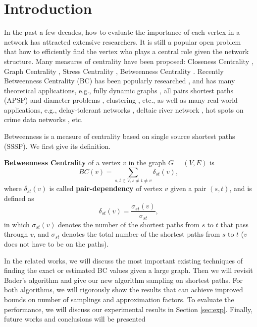 \documentclass[10pt]{article}
\begin{document}
\section{Introduction}
In the past a few decades, how to evaluate the importance of each vertex in a network has attracted extensive researchers. It is still a popular open problem that how to efficiently find the vertex who plays a central role given the network structure. Many measures of centrality have been proposed: Closeness Centrality \cite{sabidussi1966centrality}, Graph Centrality \cite{hage1995eccentricity}, Stress Centrality \cite{shimbel1953structural}, Betweenness Centrality \cite{freeman1977set}. Recently Betweenness Centrality (BC) has been popularly researched \cite{bader2007approximating, brandes2008variants, abboud2015subcubic}, and has many theoretical applications, e.g., fully dynamic graphs \cite{lee2016efficient}, all pairs shortest paths (APSP) and diameter problems \cite{abboud2015subcubic}, clustering \cite{fairbanks2015behavioral}, etc., as well as many real-world applications, e.g., delay-tolerant networks \cite{magaia2015betweenness}, deltaic river network \cite{cui2015assessment}, hot spots on crime data networks \cite{sivaranjani2015mitigating}, etc.

Betweenness is a measure of centrality based on single source shortest paths (SSSP). We first give its definition.
\begin{definition}
\label{def:bc}
{\bf Betweenness Centrality} \cite{freeman1977set, brandes2001faster, bader2007approximating} of a vertex $v$ in the graph $G=(V,E)$ is
\begin{equation}
BC(v) = \sum_{s,t\in V, s\not=t\not=v} \delta_{st}(v),
\end{equation}
where $\delta_{st}(v)$ is called {\bf pair-dependency} of vertex $v$ given a pair $(s,t)$, and is defined as
\begin{equation}
\delta_{st}(v) = \frac{\sigma_{st}(v)}{\sigma_{st}},
\end{equation}
in which $\sigma_{st}(v)$ denotes the number of the shortest paths from $s$ to $t$ that pass through $v$, and $\sigma_{st}$ denotes the total number of the shortest paths from $s$ to $t$ ($v$ does not have to be on the paths).
\end{definition}
In the related works, we will discuss the most important existing techniques of finding the exact or estimated BC values given a large graph. Then we will revisit Bader's algorithm and give our new algorithm sampling on shortest paths. For both algorithms, we will rigorously show the results that can achieve improved bounds on number of samplings and approximation factors. To evaluate the performance, we will discuss our experimental results in Section \ref{sec:exp}. Finally, future works and conclusions will be presented
\end{document}
